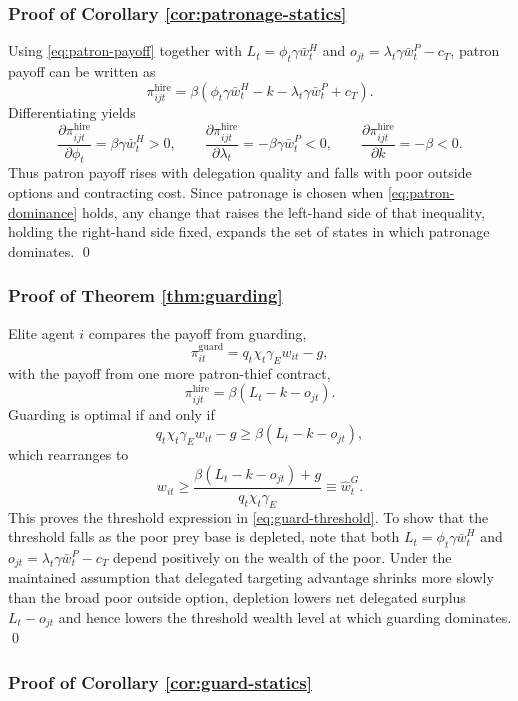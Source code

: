 \subsubsection*{Proof of Corollary \ref{cor:patronage-statics}}

Using \eqref{eq:patron-payoff} together with $L_t = \phi_t \gamma \bar{w}^{H}_t$ and $o_{jt} = \lambda_t \gamma \bar{w}^{P}_t - c_T$, patron payoff can be written as
\[
\pi^{\mathrm{hire}}_{ijt}
=
\beta\left(\phi_t \gamma \bar{w}^{H}_t - k - \lambda_t \gamma \bar{w}^{P}_t + c_T\right).
\]
Differentiating yields
\[
\frac{\partial \pi^{\mathrm{hire}}_{ijt}}{\partial \phi_t}
=
\beta \gamma \bar{w}^{H}_t > 0,
\qquad
\frac{\partial \pi^{\mathrm{hire}}_{ijt}}{\partial \lambda_t}
=
- \beta \gamma \bar{w}^{P}_t < 0,
\qquad
\frac{\partial \pi^{\mathrm{hire}}_{ijt}}{\partial k}
=
-\beta < 0.
\]
Thus patron payoff rises with delegation quality and falls with poor outside options and contracting cost. Since patronage is chosen when \eqref{eq:patron-dominance} holds, any change that raises the left-hand side of that inequality, holding the right-hand side fixed, expands the set of states in which patronage dominates. \qed

\subsubsection*{Proof of Theorem \ref{thm:guarding}}

Elite agent $i$ compares the payoff from guarding,
\[
\pi^{\mathrm{guard}}_{it} = q_t \chi_t \gamma_E w_{it} - g,
\]
with the payoff from one more patron-thief contract,
\[
\pi^{\mathrm{hire}}_{ijt} = \beta\left(L_t - k - o_{jt}\right).
\]
Guarding is optimal if and only if
\[
q_t \chi_t \gamma_E w_{it} - g \ge \beta\left(L_t - k - o_{jt}\right),
\]
which rearranges to
\[
w_{it} \ge \frac{\beta\left(L_t - k - o_{jt}\right)+g}{q_t \chi_t \gamma_E} \equiv \widehat{w}^{G}_t.
\]
This proves the threshold expression in \eqref{eq:guard-threshold}. To show that the threshold falls as the poor prey base is depleted, note that both $L_t = \phi_t \gamma \bar{w}^{H}_t$ and $o_{jt} = \lambda_t \gamma \bar{w}^{P}_t - c_T$ depend positively on the wealth of the poor. Under the maintained assumption that delegated targeting advantage shrinks more slowly than the broad poor outside option, depletion lowers net delegated surplus $L_t - o_{jt}$ and hence lowers the threshold wealth level at which guarding dominates. \qed

\subsubsection*{Proof of Corollary \ref{cor:guard-statics}}

